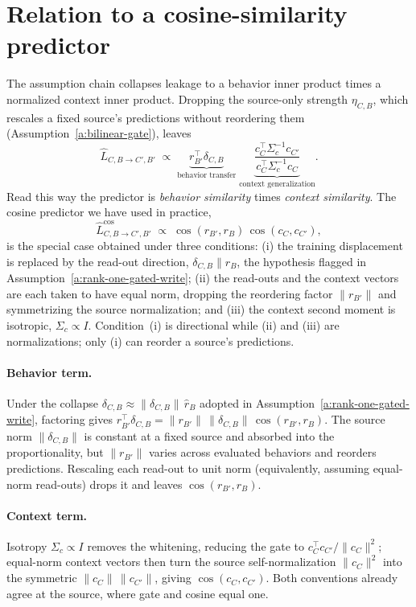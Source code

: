 \documentclass[11pt]{article}
\theoremstyle{definition}
\theoremstyle{definition}
\theoremstyle{assumptionstyle}
\newcounter{prediction}
\newcommand{\disp}{\delta_{C,B}}
\begin{document}
\section{Relation to a cosine-similarity predictor}
\label{sec:cosine}
The assumption chain collapses leakage to a behavior inner product times a normalized
context inner product. Dropping
the source-only strength \(\eta_{C,B}\), which rescales a fixed source's predictions
without reordering them (Assumption~\ref{a:bilinear-gate}), leaves
\[
\widehat L_{C,B\to C',B'}
\;\propto\;
\underbrace{r_{B'}^\top \disp}_{\text{behavior transfer}}\;
\underbrace{\frac{c_{C}^\top \Sigma_c^{-1}c_{C'}}{c_{C}^\top \Sigma_c^{-1}c_{C}}}_{\text{context generalization}}.
\]
Read this way the predictor is \emph{behavior similarity} times \emph{context
similarity}. The cosine predictor we have used in practice,
\[
\widehat L^{\cos}_{C,B\to C',B'}
\;\propto\;
\cos(r_{B'},r_B)\,\cos(c_{C},c_{C'}),
\]
is the special case obtained under three conditions: (i) the training displacement is
replaced by the read-out direction, \(\disp\parallel r_B\), the hypothesis flagged in
Assumption~\ref{a:rank-one-gated-write}; (ii) the read-outs and the context vectors are each
taken to have equal norm, dropping the reordering factor \(\lVert r_{B'}\rVert\) and
symmetrizing the source normalization; and (iii) the context second moment is isotropic,
\(\Sigma_c\propto I\). Condition~(i) is directional while (ii) and (iii) are normalizations;
only (i) can reorder a source's predictions.

\paragraph{Behavior term.} Under the collapse $\disp\approx\lVert\disp\rVert\,\hat r_B$
adopted in Assumption~\ref{a:rank-one-gated-write}, factoring gives
\(r_{B'}^\top \disp=\lVert r_{B'}\rVert\,\lVert \disp\rVert\,\cos(r_{B'},r_B)\). The source
norm \(\lVert \disp\rVert\) is constant at a fixed source and absorbed into the
proportionality, but \(\lVert r_{B'}\rVert\) varies across evaluated behaviors and
reorders predictions. Rescaling each read-out to unit norm (equivalently, assuming
equal-norm read-outs) drops it and leaves \(\cos(r_{B'},r_B)\).

\paragraph{Context term.} Isotropy \(\Sigma_c\propto I\) removes the whitening, reducing the gate
to \(c_{C}^\top c_{C'}/\lVert c_{C}\rVert^2\); equal-norm context vectors then turn
the source self-normalization \(\lVert c_{C}\rVert^2\) into the symmetric
\(\lVert c_{C}\rVert\,\lVert c_{C'}\rVert\), giving \(\cos(c_{C},c_{C'})\). Both
conventions already agree at the source, where gate and cosine equal one.
\end{document}
